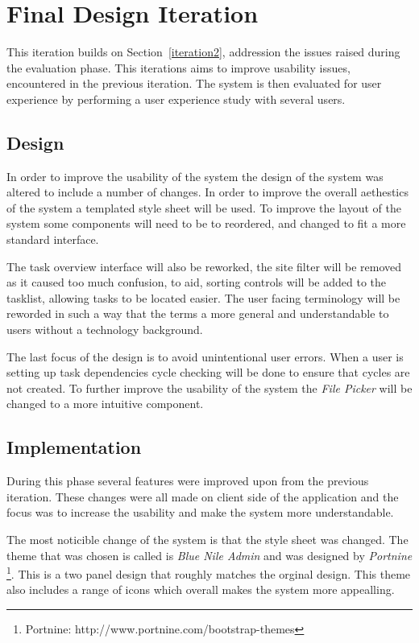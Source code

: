 \documentclass[12pt,a4paper]{report}
\begin{document}
\section{Final Design Iteration\label{iteration3}}
This iteration builds on Section~\ref{iteration2}, addression the issues raised during the evaluation
phase. This iterations aims to improve usability issues, encountered in the previous iteration. The
system is then evaluated for user experience by performing a user experience study with several users.
\subsection{Design}
In order to improve the usability of the system the design of the system was altered to include a
number of changes. In order to improve the overall aethestics of the system a templated style sheet
will be used. To improve the layout of the system some components will need to be to reordered, and
changed to fit a more standard interface.

The task overview interface will also be reworked, the site filter will be removed as it caused too
much confusion, to aid, sorting controls will be added to the tasklist, allowing tasks to be located
easier. The user facing terminology will be reworded in such a way that the terms a more general
and understandable to users without a technology background.

The last focus of the design is to avoid unintentional user errors. When a user is setting up task dependencies
cycle checking will be done to ensure that cycles are not created. To further improve the usability of the
system the \emph{File Picker} will be changed to a more intuitive component.

\subsection{Implementation}

During this phase several features were improved upon from the previous iteration.
These changes were all made on client side of the application and the focus was
to increase the usability and make the system more understandable.

The most noticible change of the system is that the style sheet was changed. The theme that
was chosen is called is \emph{Blue Nile Admin} and was designed by \emph{Portnine}
\footnote{Portnine: http://www.portnine.com/bootstrap-themes}. This is a two panel design
that roughly matches the orginal design. This theme also includes a range of icons which
overall makes the system more appealling.
\end{document}
